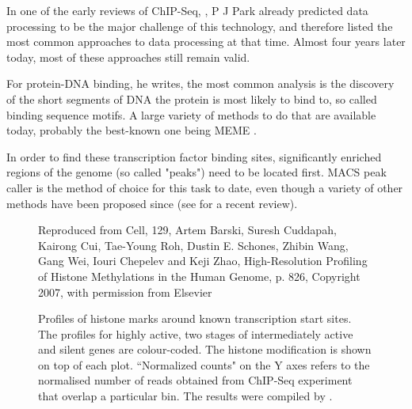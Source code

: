 \documentclass[parskip]{cs4rep}
\begin{document}
In one of the early reviews of ChIP-Seq, \cite{Park:2009wc}, P J Park already predicted data processing to be the major challenge of this technology, and therefore listed the most common approaches to data processing at that time. Almost four years later today, most of these approaches still remain valid.

For protein-DNA binding, he writes, the most common analysis is the discovery of the short segments of DNA the protein is most likely to bind to, so called binding sequence motifs. A large variety of methods to do that are available today, probably the best-known one being MEME \cite{Grundy:1997vb}.

In order to find these transcription factor binding sites, significantly enriched regions of the genome (so called "peaks") need to be located first. MACS peak caller \cite{Zhang:2008wp} is the method of choice for this task to date, even though a variety of other methods have been proposed since (see \cite{Furey:2012ha} for a recent review).

\begin{figure}[p]
   \centering
   {Reproduced from Cell, 129, Artem Barski, Suresh Cuddapah, Kairong Cui, Tae-Young Roh, Dustin E. Schones, Zhibin Wang, Gang Wei, Iouri Chepelev and Keji Zhao, High-Resolution Profiling of Histone Methylations in the Human Genome\cite{Barski:2007ww}, p. 826, Copyright 2007, with permission from Elsevier}
   \caption{Profiles of histone marks around known transcription start sites. The profiles for highly active, two stages of intermediately active and silent genes are colour-coded. The histone modification is shown on top of each plot. ``Normalized counts" on the Y axes refers to the normalised number of reads obtained from ChIP-Seq experiment that overlap a particular bin. The results were compiled by \cite{Barski:2007ww}.}
    \label{fig:motivation:histone_profiles}
\end{figure}
\end{document}
